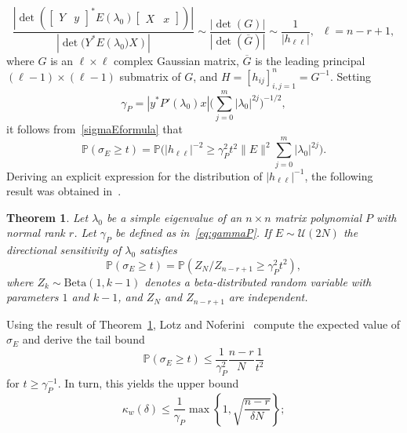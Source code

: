 \documentclass[12pt]{article}
\newcommand{\Bdist}{\mathrm{Beta}}
\newtheorem{theorem}{Theorem}[section]
\begin{document}
\begin{equation*}
    \frac{\left| \det \left(\begin{bmatrix} Y & y \end{bmatrix}^*E(\lambda_0)\begin{bmatrix} X & x \end{bmatrix}\right) \right|}{\left| \det(Y^*E\left(\lambda_0)X\right) \right|} \sim \frac{\left| \det (G) \right|}{\left| \det(\overline{G}) \right|} \sim \frac{1}{|h_{\ell \ell}|}, \;\; \ell = n-r+1,
\end{equation*}
where $G$ is an $\ell \times \ell$ complex Gaussian matrix, $\overline{G}$ is the leading principal $(\ell-1)\times (\ell-1)$ submatrix of $G$, and $H = [h_{ij}]_{i,j=1}^n=G^{-1}$. Setting
\begin{equation}\label{eq:gammaP}
    \gamma_P = |y^*P'(\lambda_0)x|\Big( \sum^m_{j=0} |\lambda_0|^{2j} \Big)^{-1/2},
\end{equation}
it follows from~\eqref{sigmaEformula} that
\[
 \mathbb{P}(\sigma_E\geq t) = \mathbb{P}\Big(  |h_{\ell\ell}|^{-2} \ge \gamma^2_P t^2 \|E\|^2 \sum^m_{j=0}|\lambda_0|^{2j}   \Big).
\]
Deriving an explicit expression for the distribution of $|h_{\ell\ell}|^{-1}$, the following result was obtained in~\cite{lotz2020wilkinson}.
\begin{theorem} \label{t:sigmaEdistr}
Let $\lambda_0$ be a simple eigenvalue of an $n\times n$ matrix polynomial $P$ with normal rank $r$. Let $\gamma_P$ be defined as in~\eqref{eq:gammaP}. If $E\sim \mathcal{U}(2N)$ the directional sensitivity of $\lambda_0$ satisfies
\[
        \mathbb{P}(\sigma_E\geq t) = \mathbb{P}(Z_N/Z_{n-r+1}\geq \gamma_P^2t^2),
\]
    where $Z_k\sim \Bdist(1,k-1)$ denotes a beta-distributed random variable with parameters $1$ and $k-1$, and $Z_N$ and $Z_{n-r+1}$ are independent.
\end{theorem}
Using the result of Theorem~\ref{t:sigmaEdistr}, Lotz and Noferini~\cite{lotz2020wilkinson} compute the expected value of $\sigma_E$ and derive the tail bound    
\[
        \mathbb{P}(\sigma_E\geq t) \leq \frac{1}{\gamma^2_P}\frac{n-r}{N}\frac{1}{t^2}
\]
for $t\geq \gamma_P^{-1}$. In turn, this yields the upper bound
\begin{equation}\label{eq:deltaWeakCondUpperBound}
\kappa_w(\delta) \leq \frac{1}{\gamma_P} \max \left\{  1,\sqrt{\frac{n-r}{\delta N}} \right\};
\end{equation}
\end{document}
